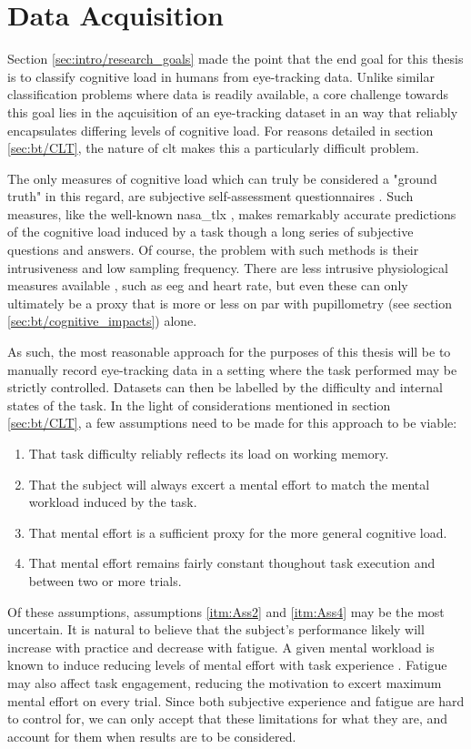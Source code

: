 \section{Data Acquisition}

Section \ref{sec:intro/research_goals} made the point that the end goal for this thesis is to classify cognitive load in humans from eye-tracking data. Unlike similar classification problems where data is readily available, a core challenge towards this goal lies in the aqcuisition of an eye-tracking dataset in an way that reliably encapsulates differing levels of cognitive load. For reasons detailed in section \ref{sec:bt/CLT}, the nature of \acrshort{clt} makes this a particularly difficult problem. 

The only measures of cognitive load which can truly be considered a "ground truth" in this regard, are subjective self-assessment questionnaires \cite{sharma2020, herbig2020}. Such measures, like the well-known \acrfull{nasa_tlx} \cite{hart1988}, makes remarkably accurate predictions of the cognitive load induced by a task though a long series of subjective questions and answers. Of course, the problem with such methods is their intrusiveness and low sampling frequency. There are less intrusive physiological measures available \cite{skulmowski2017}, such as \acrshort{eeg} and heart rate, but even these can only ultimately be a proxy that is more or less on par with pupillometry (see section \ref{sec:bt/cognitive_impacts}) alone.

As such, the most reasonable approach for the purposes of this thesis will be to manually record eye-tracking data in a setting where the task performed may be strictly controlled. Datasets can then be labelled by the difficulty and internal states of the task. In the light of considerations mentioned in section \ref{sec:bt/CLT}, a few assumptions need to be made for this approach to be viable:

\begin{enumerate}
    \item That task difficulty reliably reflects its load on working memory. \label{itm:Ass1}
    \item That the subject will always excert a mental effort to match the mental workload induced by the task. \label{itm:Ass2}
    \item That mental effort is a sufficient proxy for the more general cognitive load. \label{itm:Ass3}
    \item That mental effort remains fairly constant thoughout task execution and between two or more trials. \label{itm:Ass4}
\end{enumerate}

Of these assumptions, assumptions \ref{itm:Ass2} and \ref{itm:Ass4} may be the most uncertain. It is natural to believe that the subject's performance likely will increase with practice and decrease with fatigue. A given mental workload is known to induce reducing levels of mental effort with task experience \cite{tulga1980}. Fatigue may also affect task engagement, reducing the motivation to excert maximum mental effort on every trial. Since both subjective experience and fatigue are hard to control for, we can only accept that these limitations for what they are, and account for them when results are to be considered.